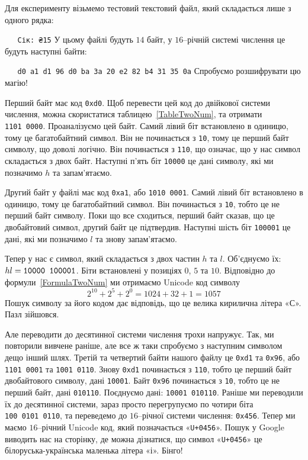 \documentclass{book}
\newcommand{\bitstr}[1]{{\tt #1}}
\newcommand{\hexstr}[1]{{\tt 0x#1}}
\newcommand{\textseq}[1]{\par\vbox{\texttt{~~~}#1}}
\newcommand{\unicode}[1]{«\bitstr{U+#1}»}
\begin{document}
Для експерименту візьмемо тестовий текстовий файл, який складається лише з одного рядка:
\textseq{\texttt{Сік: ₴15}}
\noindent У цьому файлі будуть $14$ байт, у $16$--річній системі числення це будуть наступні байти:
\textseq{\texttt{d0 a1 d1 96 d0 ba 3a 20 e2 82 b4 31 35 0a}}
\noindent Спробуємо розшифрувати цю магію!

Перший байт має код \hexstr{d0}.
Щоб перевести цей код до двійкової системи числення, можна скористатися таблицею~\ref{TableTwoNum}, та отримати \bitstr{1101~0000}.
Проаналізуємо цей байт.
Самий лівий біт встановлено в одиницю, тому це багатобайтний символ.
Він не починається з \bitstr{10}, тому це перший байт символу, що доволі логічно.
Він починається з \bitstr{110}, що означає, що у нас символ складається з двох байт.
Наступні п'ять біт \bitstr{10000} це дані символу, які ми позначимо $h$ та запам'ятаємо.

Другий байт у файлі має код \hexstr{a1}, або \bitstr{1010~0001}.
Самий лівий біт встановлено в одиницю, тому це багатобайтний символ.
Він починається з \bitstr{10}, тобто це не перший байт символу.
Поки що все сходиться, перший байт сказав, що це двобайтовий символ, другий байт це підтвердив.
Наступні шість біт \bitstr{100001} це дані, які ми позначимо $l$ та знову запам'ятаємо.

Тепер у нас є символ, який складається з двох частин $h$ та $l$.
Об'єднуємо їх: $hl = \hbox{\bitstr{10000 100001}}$.
Біти встановлені у позиціях $0$, $5$ та $10$.
Відповідно до формули~\ref{FormulaTwoNum} ми отримаємо Unicode код символу
\begin{equation}
2^{10} + 2^5 + 2^0 = 1024 + 32 + 1 = 1057
\end{equation}
Пошук символу за його кодом дає відповідь, що це велика кирилична літера «С».
Пазл зійшовся.

Але переводити до десятинної системи числення трохи напружує.
Так, ми повторили вивчене раніше, але все ж таки спробуємо з наступним символом дещо інший шлях.
Третій та четвертий байти нашого файлу це \hexstr{d1} та \hexstr{96}, або \bitstr{1101~0001} та \bitstr{1001~0110}.
Знову \hexstr{d1} починається з \bitstr{110}, тобто це перший байт двобайтового символу, дані \bitstr{10001}.
Байт \hexstr{96} починається з \bitstr{10}, тобто це не перший байт, дані \bitstr{010110}.
Поєднуємо дані: \bitstr{10001~010110}.
Раніше ми переводили їх до десятинної системи, зараз просто перегрупуємо по чотири біта \bitstr{100~0101~0110}, та переведемо до $16$--річної системи числення: \hexstr{456}.
Тепер ми маємо $16$--річний Unicode код, який позначається \unicode{0456}.
Пошук у Google виводить нас на сторінку, де можна дізнатися, що символ \unicode{0456} це білоруська-українська маленька літера «і».
Бінго!
\end{document}

